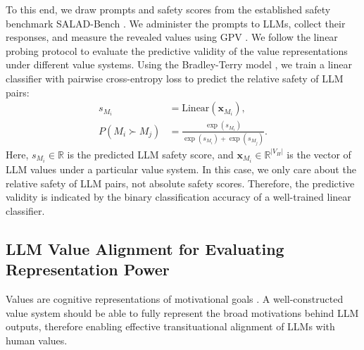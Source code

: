 To this end, we draw prompts and safety scores from the established safety benchmark SALAD-Bench \cite{li2024salad}. We administer the prompts to LLMs, collect their responses, and measure the revealed values using GPV \cite{ye2025gpv}. We follow the linear probing protocol \cite{chen2020simple} to evaluate the predictive validity of the value representations under different value systems. Using the Bradley-Terry model \cite{bradley1952rank}, we train a linear classifier with pairwise cross-entropy loss to predict the relative safety of LLM pairs:
\begin{equation}
  \begin{aligned}
    s_{M_i} &= \text{Linear}(\mathbf{x}_{M_i}),\\
    P(M_i \succ M_j) &= \frac{\exp(s_{M_i})}{\exp(s_{M_i}) + \exp(s_{M_j})}.
  \end{aligned}
\end{equation}
Here, $s_{M_i} \in \mathbb{R}$ is the predicted LLM safety score, and $\mathbf{x}_{M_i} \in \mathbb{R}^{|V_H|}$ is the vector of LLM values under a particular value system. In this case, we only care about the relative safety of LLM pairs, not absolute safety scores. Therefore, the predictive validity is indicated by the binary classification accuracy of a well-trained linear classifier.


\subsection{LLM Value Alignment for Evaluating Representation Power}\label{sec:value_alignment}

Values are cognitive representations of motivational goals \cite{schwartz2012overview}. A well-constructed value system should be able to fully represent the broad motivations behind LLM outputs, therefore enabling effective transituational alignment of LLMs with human values.

